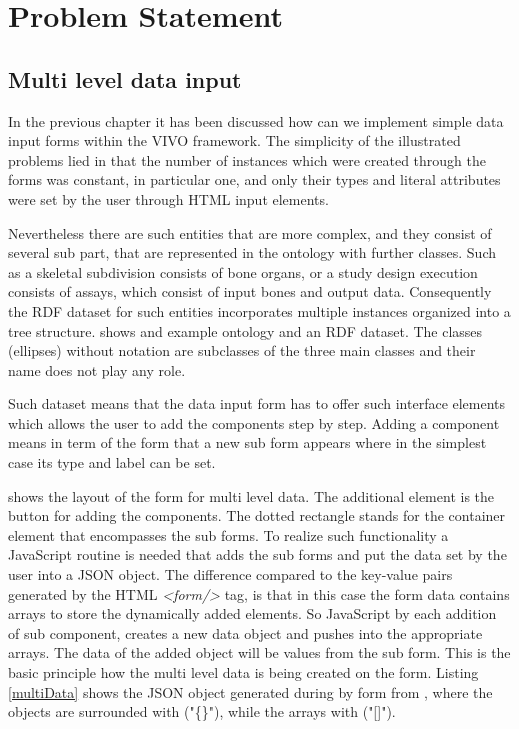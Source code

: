 \chapter{Problem Statement}


\section{Multi level data input}


In the previous chapter it has been discussed how can we implement simple data input forms within the VIVO framework. The simplicity of the illustrated problems lied in that the number of instances which were created through the forms was constant, in particular one, and only their types and literal attributes were set by the user through HTML input elements. 


Nevertheless there are such entities that are more complex, and they consist of several sub part, that are represented in the ontology with further classes. Such as a skeletal subdivision consists of bone organs, or a study design execution consists of assays, which consist of input bones and output data. Consequently the RDF dataset for such entities incorporates  multiple instances organized into a tree structure.  shows and example ontology and an RDF dataset. The classes (ellipses) without notation are subclasses of the three main classes and their name does not play any role.

Such dataset means that the data input form has to offer such interface elements which allows the user to add the components step by step. Adding a component means in term of the form that a new sub form appears where in the simplest case its type and label can be set.


 shows the layout of the form for multi level data. The additional element is the button for adding the components. The dotted rectangle stands for the container element that encompasses the sub forms. To realize such functionality a JavaScript routine is needed that adds the sub forms and put the data set by the user into a JSON object. The difference compared to the key-value pairs generated by the HTML \textit{<form/>} tag, is that 
in this case the form data contains arrays to store the dynamically added elements. So JavaScript by each addition of sub component, creates a new data object and pushes into the appropriate arrays. The data of the added object will be values from the sub form. This is the basic principle how the multi level data is being created on the form. Listing \ref{multiData} shows the JSON object generated during by form from , where the objects are surrounded with ("\{\}"), while the arrays with ("[]").

